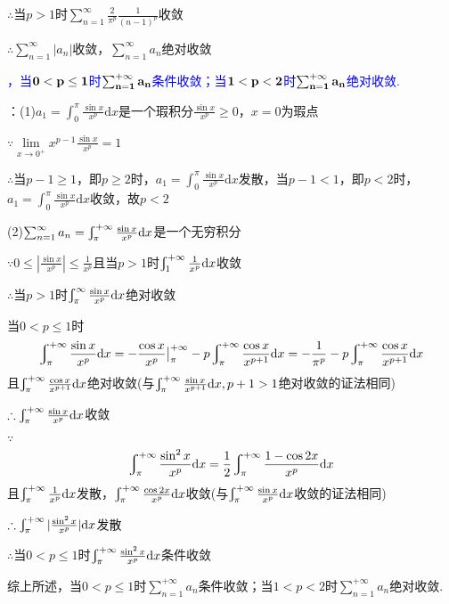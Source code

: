 \documentclass[12pt,UTF8]{ctexart}
\newcommand\Ser[1]{\sum_{n=#1}^\infty}
\newcommand{\Int}[4]{\varint\nolimits_{#1}^{#2}#3\mathrm d#4}
\begin{document}
\begin{enumerate}
$\therefore$当$p>1$时$\sum_{n=1}^\infty\frac2{\pi^p}\frac1{(n-1)^p}$收敛

$\therefore\sum_{n=1}^\infty|a_n|$收敛，$\sum_{n=1}^\infty a_n$绝对收敛

\textcolor{blue}{，当$\bf{0<p\leq1}$时$\bf{\sum_{n=1}^{+\infty}a_n}$条件收敛；当$\bf{1<p<2}$时$\bf{\sum_{n=1}^{+\infty}a_n}$绝对收敛}.

{：}(1)$a_1=\int_0^\pi\frac{\sin x}{x^p}\mathrm dx$是一个瑕积分$\frac{\sin x}{x^p}\geq0$，$x=0$为瑕点

$\because\lim\limits_{x\rightarrow0^+}x^{p-1}\frac{\sin x}{x^p}=1$

$\therefore$当$p-1\geq1$，即$p\geq2$时，$a_1=\int_0^\pi\frac{\sin x}{x^p}\mathrm dx$发散，当$p-1<1$，即$p<2$时，$a_1=\int_0^\pi\frac{\sin x}{x^p}\mathrm dx$收敛，故$p<2$

(2)$\Ser1a_n=\Int\pi{+\infty}{\frac{\sin x}{x^p}}x$是一个无穷积分

$\because0\leq|\frac{\sin x}{x^p}|\leq\frac1{x^p}$且当$p>1$时$\Int1{+\infty}{\frac1{x^p}}x$收敛

$\therefore$当$p>1$时$\Int\pi\infty{\frac{\sin x}{x^p}}x$绝对收敛

当$0<p\leq1$时
\[\Int\pi{+\infty}{\frac{\sin x}{x^p}}x=-\frac{\cos x}{x^p}\big|_\pi^{+\infty}-p\Int\pi{+\infty}{\frac{\cos x}{x^{p+1}}}x=-\frac1{\pi^p}-p\Int\pi{+\infty}{\frac{\cos x}{x^{p+1}}}x\]且$\Int\pi{+\infty}{\frac{\cos x}{x^{p+1}}}x$绝对收敛(与$\Int\pi{+\infty}{\frac{\sin x}{x^{p+1}}}x,p+1>1$绝对收敛的证法相同)

$\therefore\Int\pi{+\infty}{\frac{\sin x}{x^p}}x$收敛

$\because$
\[\Int\pi{+\infty}{\frac{\sin^2x}{x^p}}x=\frac12\Int\pi{+\infty}{\frac{1-\cos2x}{x^p}}x\]
且$\Int\pi{+\infty}{\frac1{x^p}}x$发散，$\Int\pi{+\infty}{\frac{\cos2x}{x^p}}x$收敛(与$\Int\pi{+\infty}{\frac{\sin x}{x^p}}x$收敛的证法相同)

$\therefore\Int\pi{+\infty}{|\frac{\sin^2x}{x^p}|}x$发散

$\therefore$当$0<p\leq1$时$\Int\pi{+\infty}{\frac{\sin^2x}{x^p}}x$条件收敛

综上所述，当$0<p\leq1$时$\sum_{n=1}^{+\infty}a_n$条件收敛；当$1<p<2$时$\sum_{n=1}^{+\infty}a_n$绝对收敛.
\end{enumerate}
\end{document}
